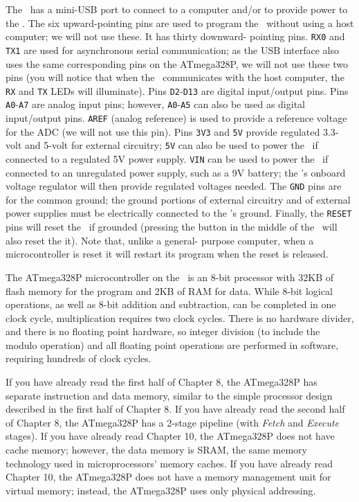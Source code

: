 The \nano\ has a mini-USB port to connect to a computer and/or to provide power
to the \nano. The six upward-pointing pins are used to program the \nano\
without using a host computer; we will not use these. It has thirty downward-
pointing pins. \texttt{RX0} and \texttt{TX1} are used for asynchronous serial
communication; as the USB interface also uses the same corresponding pins on
the ATmega328P, we will not use these two pins (you will notice that when the
\nano\ communicates with the host computer, the \texttt{RX} and \texttt{TX}
LEDs will illuminate). Pins \texttt{D2}-\texttt{D13} are digital input/output
pins. Pins \texttt{A0}-\texttt{A7} are analog input pins; however,
\texttt{A0}-\texttt{A5} can also be used as digital input/output pins.
\texttt{AREF} (analog reference) is used to provide a reference voltage for the
ADC (we will not use this pin). Pins \texttt{3V3} and \texttt{5V} provide
regulated 3.3-volt and 5-volt for external circuitry; \texttt{5V} can also be
used to power the \nano\ if connected to a regulated 5V power supply.
\texttt{VIN} can be used to power the \nano\ if connected to an unregulated
power supply, such as a 9V battery; the \nano's onboard voltage regulator will
then provide regulated voltages needed. The \texttt{GND} pins are for the
common ground; the ground portions of external circuitry and of external power
supplies must be electrically connected to the \nano's ground. Finally, the
\texttt{RESET} pins will reset the \nano\ if grounded (pressing the button in
the middle of the \nano\ will also reset the it). Note that, unlike a general-
purpose computer, when a microcontroller is reset it will restart its program
when the reset is released.

The ATmega328P microcontroller on the \nano\ is an 8-bit processor with
32KB of flash memory for the program and 2KB of RAM for data. While 8-bit
logical operations, as well as 8-bit addition and subtraction, can be completed
in one clock cycle, multiplication requires two clock cycles. There is no
hardware divider, and there is no floating point hardware, so integer division
(to include the modulo operation) and all floating point operations are
performed in software, requiring hundreds of clock cycles.

If you have already read the first half of Chapter 8, the ATmega328P has
separate instruction and data memory, similar to the simple processor design
described in the first half of Chapter 8. If you have already read the second
half of Chapter 8, the ATmega328P has a 2-stage pipeline (with \textit{Fetch}
and \textit{Execute} stages). If you have already read Chapter 10, the
ATmega328P does not have cache memory; however, the data memory is SRAM, the
same memory technology used in microprocessors' memory caches. If you have
already read Chapter 10, the ATmega328P does not have a memory management unit
for virtual memory; instead, the ATmega328P uses only physical addressing.

